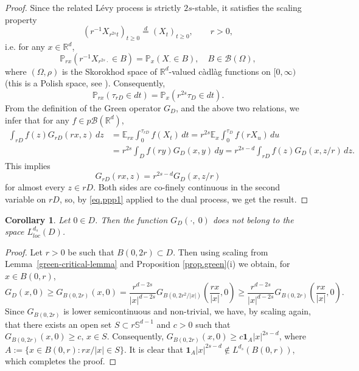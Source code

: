 \documentclass[11pt,a4paper,reqno]{amsart}
\newtheorem{corollary}[theorem]{\bf Corollary}
\theoremstyle{definition}
\numberwithin{equation}{section}
\begin{document}
\begin{proof}
Since   the related L\'evy process  is strictly $2s$-stable, it satisfies the scaling property
\[
\left(r^{-1}X_{r^{2s} t}\right)_{t\ge 0}\stackrel{d}{=}(X_t)_{t\ge 0}, \qquad r>0,
\]
i.e. for any $x\in\mathbb R^d$,
\[
\mathbb P_{rx}(r^{-1}X_{r^{2s} \cdot} \in B)= \mathbb P_x(X_\cdot\in B),\quad B\in\mathcal B(\Omega),
\]
where   $(\Omega,\rho)$ is  the Skorokhod space of $\mathbb R^d$-valued c\`adl\`ag functions 
on $[0,\infty)$ (this is a Polish space, see \cite[Section 12]{bil}).
Consequently, 
\[
\mathbb P_{rx}(\tau_{rD}\in dt)=\mathbb P_x(r^{2s}\tau_D\in dt).
\]
From the  definition of the Green operator $G_D$, and the above two relations, we infer that
for any $f\in p\mathscr B(\mathbb R^d)$,
\[
\begin{split}
\int_{rD} f(z) G_{rD}(rx,z)\,dz
&=
\mathbb{E}_{rx} \int_0^{\tau_{rD}} f(X_t)\,dt=r^{2s} \mathbb{E}_x \int_0^{\tau_D} f(rX_u)\,du
\\&=
r^{2s} \int_D f(ry) G_D(x,y)\,dy=r^{2s-d} \int_{rD} f(z) G_D(x,z/r)\,dz.
\end{split}
\]
This implies
\[
G_{rD}(rx,z) = r^{2s-d} G_D(x,z/r)
\]
for almost every $z\in rD$.  Both sides are co-finely continuous in the second variable on
$rD$, so, by \eqref{eq.ppp1} applied to the dual process, we get the result.
\end{proof}





\begin{corollary}
\label{green-critical}
Let $0\in D$. Then the  function $G_D(\cdot,\ 0)$ does not belong to the space $L^{{d_s}}_{loc}(D)$.
\end{corollary}
\begin{proof}
Let $r>0$ be such that $B(0,2r)\subset D$. Then using scaling from Lemma~\ref{green-critical-lemma} and Proposition \ref{prop.green}(i) we obtain, for $x\in B(0,r)$,
\[
G_D(x,0)\ge G_{B(0,2r)}(x,0)=\frac{r^{d-2s}}{|x|^{d-2s}}G_{B(0,2r^2/|x|)}\left(\frac{rx}{|x|},0\right)\ge \frac{r^{d-2s}}{|x|^{d-2s}}G_{B(0,2r)}\left(\frac{rx}{|x|},0\right).
\]
Since $G_{B(0,2r)}$ is lower semicontinuous and non-trivial, we have, by scaling again, that there exists an open 
set $S\subset r\mathbb S^{d-1}$ and $c>0$ such that $G_{B(0,2r)}(x,0)\ge c,\, x\in S$.
Consequently, $G_{B(0,2r)}(x,0)\ge c\mathbf1_A|x|^{2s-d}$, where  $A:=\{x\in B(0,r):  rx/|x|\in S\}$.
It is clear that $\mathbf1_A|x|^{2s-d}\notin L^{{d_s}}(B(0,r))$, which completes the proof.
\end{proof}
\end{document}
